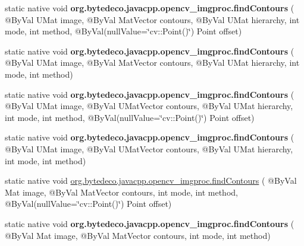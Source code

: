 \begin{DoxyCompactItemize}
\item 
\mbox{\label{group__imgproc__shape_ga26b5d7abef556a54da3c295fe355a1e1}} 
static native void {\bfseries org.\+bytedeco.\+javacpp.\+opencv\+\_\+imgproc.\+find\+Contours} ( @By\+Val U\+Mat image, @By\+Val Mat\+Vector contours, @By\+Val U\+Mat hierarchy, int mode, int method, @By\+Val(null\+Value=\char`\"{}cv\+::\+Point()\char`\"{}) Point offset)
\item 
\mbox{\label{group__imgproc__shape_ga475333c1bd51ec2b3c72f5849c294ce2}} 
static native void {\bfseries org.\+bytedeco.\+javacpp.\+opencv\+\_\+imgproc.\+find\+Contours} ( @By\+Val U\+Mat image, @By\+Val Mat\+Vector contours, @By\+Val U\+Mat hierarchy, int mode, int method)
\item 
\mbox{\label{group__imgproc__shape_ga666cc59514d27b672aa1e7d6942b7f98}} 
static native void {\bfseries org.\+bytedeco.\+javacpp.\+opencv\+\_\+imgproc.\+find\+Contours} ( @By\+Val U\+Mat image, @By\+Val U\+Mat\+Vector contours, @By\+Val U\+Mat hierarchy, int mode, int method, @By\+Val(null\+Value=\char`\"{}cv\+::\+Point()\char`\"{}) Point offset)
\item 
\mbox{\label{group__imgproc__shape_ga6ef8f480fda759a0611e6a3f4660e520}} 
static native void {\bfseries org.\+bytedeco.\+javacpp.\+opencv\+\_\+imgproc.\+find\+Contours} ( @By\+Val U\+Mat image, @By\+Val U\+Mat\+Vector contours, @By\+Val U\+Mat hierarchy, int mode, int method)
\item 
static native void \hyperlink{group__imgproc__shape_ga9242b107e02badf32d704830cda84585}{org.\+bytedeco.\+javacpp.\+opencv\+\_\+imgproc.\+find\+Contours} ( @By\+Val Mat image, @By\+Val Mat\+Vector contours, int mode, int method, @By\+Val(null\+Value=\char`\"{}cv\+::\+Point()\char`\"{}) Point offset)
\item 
\mbox{\label{group__imgproc__shape_ga902eb6627cfe9fe9909503672730d0f5}} 
static native void {\bfseries org.\+bytedeco.\+javacpp.\+opencv\+\_\+imgproc.\+find\+Contours} ( @By\+Val Mat image, @By\+Val Mat\+Vector contours, int mode, int method)
\item 
\mbox{\label{group__imgproc__shape_ga0d4a57c0961e15ad326f3cffb2005621}} 

\end{DoxyCompactItemize}

